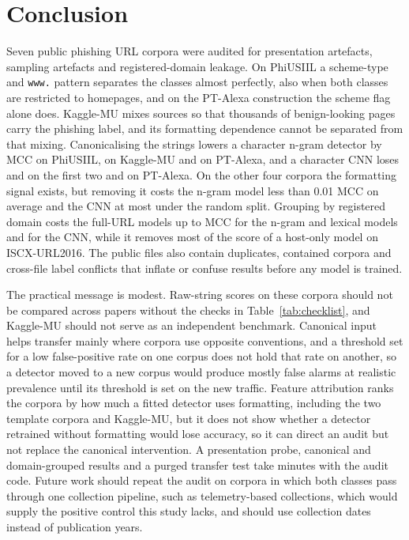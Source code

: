 \section{Conclusion}
\label{sec:conclusion}
Seven public phishing URL corpora were audited for presentation artefacts, sampling artefacts and registered-domain leakage. On PhiUSIIL a scheme-type and \texttt{www.} pattern separates the classes almost perfectly, also when both classes are restricted to homepages, and on the PT-Alexa construction the scheme flag alone does. Kaggle-MU mixes sources so that thousands of benign-looking pages carry the phishing label, and its formatting dependence cannot be separated from that mixing. Canonicalising the strings lowers a character n-gram detector by \DRawVsCanonPhiUSIIL{} MCC on PhiUSIIL, \DRawVsCanonKaggleMU{} on Kaggle-MU and \DRawVsCanonPTAlexa{} on PT-Alexa, and a character CNN loses \CNNDropPhiUSIILRandom{} and \CNNDropKaggleMURandom{} on the first two and \CNNDropPTAlexaRandom{} on PT-Alexa. On the other four corpora the formatting signal exists, but removing it costs the n-gram model less than 0.01 MCC on average and the CNN at most \CNNDropHannousseRandom{} under the random split. Grouping by registered domain costs the full-URL models up to \DLexicalRandomVsDomainKaggleMU{} MCC for the n-gram and lexical models and \CNNGroupCostISCXURL{} for the CNN, while it removes most of the score of a host-only model on ISCX-URL2016. The public files also contain duplicates, contained corpora and cross-file label conflicts that inflate or confuse results before any model is trained.

The practical message is modest. Raw-string scores on these corpora should not be compared across papers without the checks in Table~\ref{tab:checklist}, and Kaggle-MU should not serve as an independent benchmark. Canonical input helps transfer mainly where corpora use opposite conventions, and a threshold set for a low false-positive rate on one corpus does not hold that rate on another, so a detector moved to a new corpus would produce mostly false alarms at realistic prevalence until its threshold is set on the new traffic. Feature attribution ranks the corpora by how much a fitted detector uses formatting, including the two template corpora and Kaggle-MU, but it does not show whether a detector retrained without formatting would lose accuracy, so it can direct an audit but not replace the canonical intervention. A presentation probe, canonical and domain-grouped results and a purged transfer test take minutes with the audit code. Future work should repeat the audit on corpora in which both classes pass through one collection pipeline, such as telemetry-based collections, which would supply the positive control this study lacks, and should use collection dates instead of publication years.
